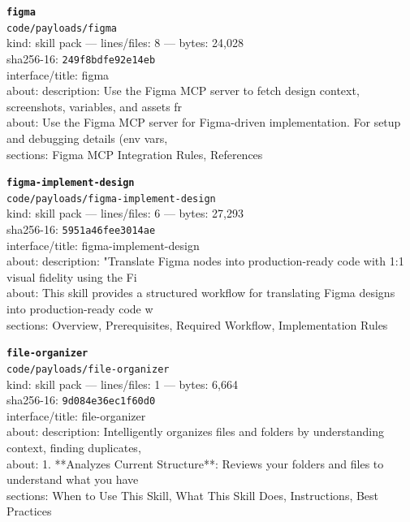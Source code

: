 \noindent\textbf{\texttt{figma}}\\
\texttt{code/payloads/figma}\\
kind: skill pack --- lines/files: 8 --- bytes: 24,028\\
sha256-16: \texttt{249f8bdfe92e14eb}\\
interface/title: figma\\
about: description: Use the Figma MCP server to fetch design context, screenshots, variables, and assets fr\\
about: Use the Figma MCP server for Figma-driven implementation. For setup and debugging details (env vars,\\
sections: Figma MCP Integration Rules, References\\
\vspace*{6.0pt}

\noindent\textbf{\texttt{figma-implement-design}}\\
\texttt{code/payloads/figma-implement-design}\\
kind: skill pack --- lines/files: 6 --- bytes: 27,293\\
sha256-16: \texttt{5951a46fee3014ae}\\
interface/title: figma-implement-design\\
about: description: "Translate Figma nodes into production-ready code with 1:1 visual fidelity using the Fi\\
about: This skill provides a structured workflow for translating Figma designs into production-ready code w\\
sections: Overview, Prerequisites, Required Workflow, Implementation Rules\\
\vspace*{6.0pt}
\newpage

\noindent\textbf{\texttt{file-organizer}}\\
\texttt{code/payloads/file-organizer}\\
kind: skill pack --- lines/files: 1 --- bytes: 6,664\\
sha256-16: \texttt{9d084e36ec1f60d0}\\
interface/title: file-organizer\\
about: description: Intelligently organizes files and folders by understanding context, finding duplicates,\\
about: 1. **Analyzes Current Structure**: Reviews your folders and files to understand what you have\\
sections: When to Use This Skill, What This Skill Does, Instructions, Best Practices\\
\vspace*{6.0pt}

